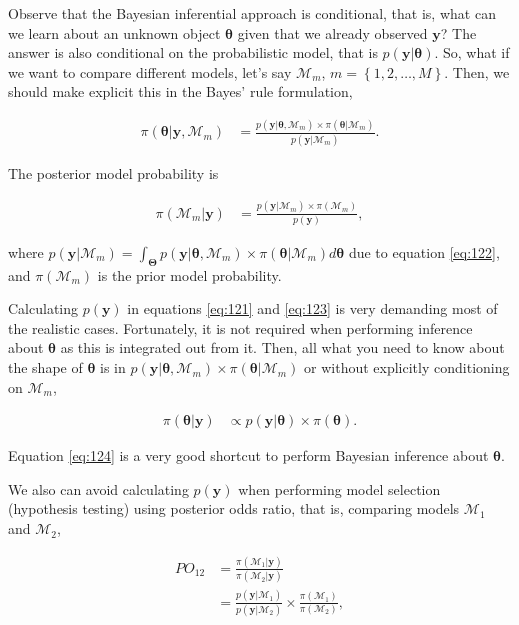 Observe that the Bayesian inferential approach is conditional, that is, what can we learn about an unknown object $\bm{\theta}$ given that we already observed $\mathbf{y}$? The answer is also conditional on the probabilistic model, that is $p(\mathbf{y}|\bm{\theta})$. So, what if we want to compare different models, let's say $\mathcal{M}_m$, $m=\left\{1,2,\dots,M\right\}$. Then, we should make explicit this in the Bayes' rule formulation, 

\begin{align}
	\pi(\bm{\theta}|\mathbf{y},\mathcal{M}_m)&=\frac{p(\mathbf{y}|\bm{\theta},\mathcal{M}_m) \times \pi(\bm{\theta}|\mathcal{M}_m)}{p(\mathbf{y}|\mathcal{M}_m)}.
	\label{eq:122}
\end{align}

The posterior model probability is

\begin{align}
	\pi(\mathcal{M}_m|\mathbf{y})&=\frac{p(\mathbf{y}|\mathcal{M}_m) \times \pi(\mathcal{M}_m)}{p(\mathbf{y})}, 
	\label{eq:123}
\end{align}

where $p(\mathbf{y}|\mathcal{M}_m)=\int_{\mathbf{\Theta}}p(\mathbf{y}|\bm{\theta},\mathcal{M}_m) \times \pi(\bm{\theta}|\mathcal{M}_m)d\bm{\theta}$ due to equation \ref{eq:122}, and $\pi(\mathcal{M}_m)$ is the prior model probability. 

Calculating $p(\mathbf{y})$ in equations \ref{eq:121} and \ref{eq:123} is very demanding most of the realistic cases. Fortunately, it is not required when performing inference about $\bm{\theta}$ as this is integrated out from it. Then, all what you need to know about the shape of $\bm{\theta}$ is in $p(\mathbf{y}|\bm{\theta},\mathcal{M}_m) \times \pi(\bm{\theta}|\mathcal{M}_m)$ or without explicitly conditioning on $\mathcal{M}_m$,

\begin{align}
	\pi(\bm{\theta}|\mathbf{y})& \propto p(\mathbf{y}|\bm{\theta}) \times \pi(\bm{\theta}).
	\label{eq:124}
\end{align}

Equation \ref{eq:124} is a very good shortcut to perform Bayesian inference about $\bm{\theta}$.

We also can avoid calculating $p(\mathbf{y})$ when performing model selection (hypothesis testing) using posterior odds ratio, that is, comparing models $\mathcal{M}_1$ and $\mathcal{M}_2$,

\begin{align}
	PO_{12}&=\frac{\pi(\mathcal{M}_1|\mathbf{y})}{\pi(\mathcal{M}_2|\mathbf{y})} \nonumber \\
	&=\frac{p(\mathbf{y}|\mathcal{M}_1)}{p(\mathbf{y}|\mathcal{M}_2)}\times\frac{\pi(\mathcal{M}_1)}{\pi(\mathcal{M}_2)},
	\label{eq:125}
\end{align}

